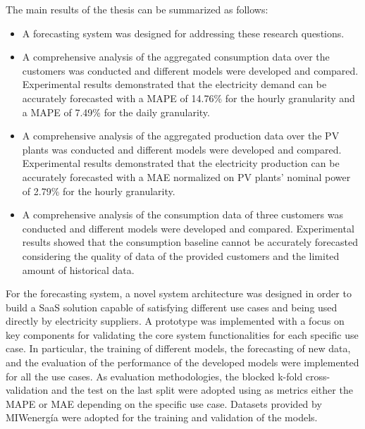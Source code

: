 The main results of the thesis can be summarized as follows:
\begin{itemize}
  \item A forecasting system was designed for addressing these research questions.
  \item A comprehensive analysis of the aggregated consumption data over the customers was conducted and different models were developed and compared. Experimental results demonstrated that the electricity demand can be accurately forecasted with a MAPE of 14.76\% for the hourly granularity and a MAPE of 7.49\% for the daily granularity.
  \item A comprehensive analysis of the aggregated production data over the PV plants was conducted and different models were developed and compared. Experimental results demonstrated that the electricity production can be accurately forecasted with a MAE normalized on PV plants' nominal power of 2.79\% for the hourly granularity.
  \item A comprehensive analysis of the consumption data of three customers was conducted and different models were developed and compared. Experimental results showed that the consumption baseline cannot be accurately forecasted considering the quality of data of the provided customers and the limited amount of historical data.
\end{itemize}

For the forecasting system, a novel system architecture was designed in order to build a SaaS solution capable of satisfying different use cases and being used directly by electricity suppliers.
A prototype was implemented with a focus on key components for validating the core system functionalities for each specific use case.
In particular, the training of different models, the forecasting of new data, and the evaluation of the performance of the developed models were implemented for all the use cases.
As evaluation methodologies, the blocked k-fold cross-validation and the test on the last split were adopted using as metrics either the MAPE or MAE depending on the specific use case.
Datasets provided by MIWenergía were adopted for the training and validation of the models.

